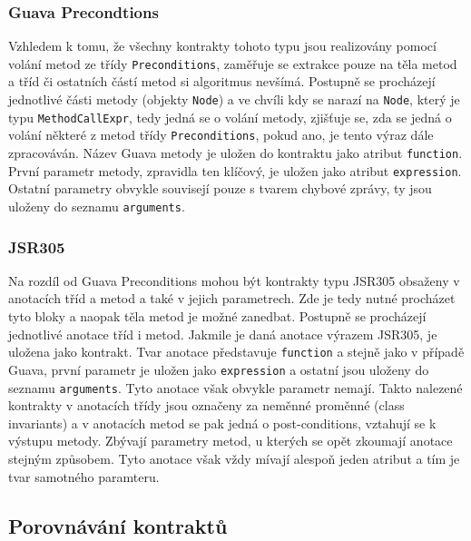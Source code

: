 			\subsubsection{Guava Precondtions}
				Vzhledem k tomu, že všechny kontrakty tohoto typu jsou realizovány pomocí volání metod ze třídy \texttt{Preconditions}, zaměřuje se extrakce pouze na těla metod a tříd či ostatních částí metod si algoritmus nevšímá. Postupně se procházejí jednotlivé části metody (objekty \texttt{Node}) a ve chvíli kdy se narazí na \texttt{Node}, který je typu \texttt{MethodCallExpr}, tedy jedná se o volání metody, zjišťuje se, zda se jedná o volání některé z metod třídy \texttt{Preconditions}, pokud ano, je tento výraz dále zpracováván. Název Guava metody je uložen do kontraktu jako atribut \texttt{function}. První parametr metody, zpravidla ten klíčový, je uložen jako atribut \texttt{expression}. Ostatní parametry obvykle souvisejí pouze s tvarem chybové zprávy, ty jsou uloženy do seznamu \texttt{arguments}.
				
			\subsubsection{JSR305}
				Na rozdíl od Guava Preconditions mohou být kontrakty typu JSR305 obsaženy v anotacích tříd a metod a také v jejich parametrech. Zde je tedy nutné procházet tyto bloky a naopak těla metod je možné zanedbat. Postupně se procházejí jednotlivé anotace tříd i metod. Jakmile je daná anotace výrazem JSR305, je uložena jako kontrakt. Tvar anotace představuje \texttt{function} a stejně jako v případě Guava, první parametr je uložen jako \texttt{expression} a ostatní jsou uloženy do seznamu \texttt{arguments}. Tyto anotace však obvykle parametr nemají. Takto nalezené kontrakty v anotacích třídy jsou označeny za neměnné proměnné (class invariants) a v anotacích metod se pak jedná o post-conditions, vztahují se k výstupu metody. Zbývají parametry metod, u kterých se opět zkoumají anotace stejným způsobem. Tyto anotace však vždy mívají alespoň jeden atribut a tím je tvar samotného paramteru.


	    \subsection{Porovnávání kontraktů}


